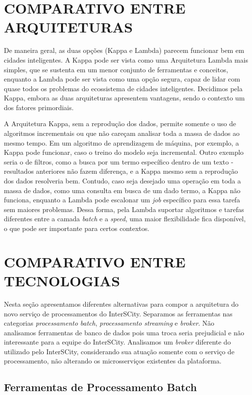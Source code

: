 \section{COMPARATIVO ENTRE ARQUITETURAS}

De maneira geral, as duas opções (Kappa e Lambda) parecem funcionar bem em
cidades inteligentes. A Kappa pode ser vista como uma Arquitetura Lambda mais
simples, que se sustenta em um menor conjunto de ferramentas e
conceitos, enquanto a Lambda pode ser vista como uma opção segura,
capaz de lidar com quase todos os problemas do ecossistema de cidades
inteligentes. Decidimos pela Kappa, embora as duas arquiteturas apresentem
vantagens, sendo o contexto um dos fatores primordiais.

A Arquitetura Kappa, sem a reprodução dos dados, permite somente o uso de
algoritmos incrementais ou que não careçam analisar toda a massa de dados ao
mesmo tempo. Em um algoritmo de aprendizagem de máquina, por exemplo, a Kappa
pode funcionar, caso o treino do modelo seja incremental. Outro exemplo
seria o de filtros, como a busca por um termo específico dentro de um texto -
resultados anteriores não fazem diferença, e a Kappa mesmo sem a reprodução
dos dados resolveria bem. Contudo, caso seja desejado uma operação em toda
a massa de dados, como uma consulta em busca de um dado termo, a Kappa
não funciona, enquanto a Lambda pode escalonar um \textit{job} específico para essa
tarefa sem maiores problemas. Dessa forma, pela Lambda suportar algoritmos e tarefas
diferentes entre a camada \textit{batch} e a \textit{speed}, uma maior
flexibilidade fica disponível, o que pode ser importante para certos contextos.

\section{COMPARATIVO ENTRE TECNOLOGIAS}

Nesta seção apresentamos diferentes alternativas para compor a arquitetura do
novo serviço de processamentos do InterSCity. Separamos as ferramentas
nas categorias \textit{processamento batch}, \textit{processamento streaming}
e \textit{broker}. Não analisamos ferramentas de banco de dados pois
uma troca seria prejudicial e não interessante para a equipe do InterSCity.
Analisamos um \textit{broker} diferente do utilizado pelo InterSCity,
considerando sua atuação somente com o serviço de processamento, não alterando
os microsserviços existentes da plataforma.

\subsection{Ferramentas de Processamento Batch}

